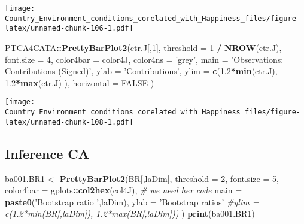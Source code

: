 \documentclass[]{book}
\newenvironment{Shaded}{\begin{snugshade}}{\end{snugshade}}
\newcommand{\CommentTok}[1]{\textcolor[rgb]{0.56,0.35,0.01}{\textit{#1}}}
\newcommand{\DataTypeTok}[1]{\textcolor[rgb]{0.13,0.29,0.53}{#1}}
\newcommand{\DecValTok}[1]{\textcolor[rgb]{0.00,0.00,0.81}{#1}}
\newcommand{\FloatTok}[1]{\textcolor[rgb]{0.00,0.00,0.81}{#1}}
\newcommand{\KeywordTok}[1]{\textcolor[rgb]{0.13,0.29,0.53}{\textbf{#1}}}
\newcommand{\NormalTok}[1]{#1}
\newcommand{\OperatorTok}[1]{\textcolor[rgb]{0.81,0.36,0.00}{\textbf{#1}}}
\newcommand{\OtherTok}[1]{\textcolor[rgb]{0.56,0.35,0.01}{#1}}
\newcommand{\StringTok}[1]{\textcolor[rgb]{0.31,0.60,0.02}{#1}}
\begin{document}
\texttt{[image: Country\_Environment\_conditions\_corelated\_with\_Happiness\_files/figure-latex/unnamed-chunk-106-1.pdf]}

\begin{Shaded}
\begin{Highlighting}[]
\NormalTok{PTCA4CATA}\OperatorTok{::}\KeywordTok{PrettyBarPlot2}\NormalTok{(ctr.J[,}\DecValTok{1}\NormalTok{], }
                       \DataTypeTok{threshold =} \DecValTok{1} \OperatorTok{/}\StringTok{ }\KeywordTok{NROW}\NormalTok{(ctr.J), }
                       \DataTypeTok{font.size =} \DecValTok{4}\NormalTok{, }
                       \DataTypeTok{color4bar =}\NormalTok{ color4J, }
                       \DataTypeTok{color4ns =} \StringTok{'grey'}\NormalTok{, }
                       \DataTypeTok{main =} \StringTok{'Observations: Contributions (Signed)'}\NormalTok{, }
                       \DataTypeTok{ylab =} \StringTok{'Contributions'}\NormalTok{, }\DataTypeTok{ylim =} \KeywordTok{c}\NormalTok{(}\FloatTok{1.2}\OperatorTok{*}\KeywordTok{min}\NormalTok{(ctr.J),}
                        \FloatTok{1.2}\OperatorTok{*}\KeywordTok{max}\NormalTok{(ctr.J) ), }
                       \DataTypeTok{horizontal =} \OtherTok{FALSE}\NormalTok{ ) }
\end{Highlighting}
\end{Shaded}

\texttt{[image: Country\_Environment\_conditions\_corelated\_with\_Happiness\_files/figure-latex/unnamed-chunk-108-1.pdf]}

\hypertarget{inference-ca}{%
\subsection{Inference CA}\label{inference-ca}}

\begin{Shaded}
\begin{Highlighting}[]
\NormalTok{ba001.BR1 <-}\StringTok{ }\KeywordTok{PrettyBarPlot2}\NormalTok{(BR[,laDim],}
                          \DataTypeTok{threshold =} \DecValTok{2}\NormalTok{,}
                          \DataTypeTok{font.size =} \DecValTok{5}\NormalTok{,}
                          \DataTypeTok{color4bar =}\NormalTok{ gplots}\OperatorTok{::}\KeywordTok{col2hex}\NormalTok{(col4J), }\CommentTok{# we need hex code}
                          \DataTypeTok{main =} \KeywordTok{paste0}\NormalTok{(}\StringTok{'Bootstrap ratio '}\NormalTok{,laDim),}
                          \DataTypeTok{ylab =} \StringTok{'Bootstrap ratios'}
                          \CommentTok{#ylim = c(1.2*min(BR[,laDim]), 1.2*max(BR[,laDim]))}
\NormalTok{)}
\KeywordTok{print}\NormalTok{(ba001.BR1)}
\end{Highlighting}
\end{Shaded}
\end{document}
